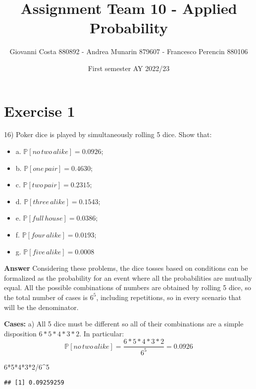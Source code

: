 \documentclass[
]{article}
\title{Assignment Team 10 - Applied Probability}
\author{Giovanni Costa 880892 - Andrea Munarin 879607 - Francesco
Perencin 880106}
\date{First semester AY 2022/23}
\newenvironment{Shaded}{\begin{snugshade}}{\end{snugshade}}
\newcommand{\DecValTok}[1]{\textcolor[rgb]{0.00,0.00,0.81}{#1}}
\newcommand{\SpecialCharTok}[1]{\textcolor[rgb]{0.00,0.00,0.00}{#1}}
\providecommand{\tightlist}{%
  \setlength{\itemsep}{0pt}\setlength{\parskip}{0pt}}
\begin{document}
\maketitle

{
\setcounter{tocdepth}{2}
\tableofcontents
}
\hypertarget{exercise-1}{%
\section{Exercise 1}\label{exercise-1}}

16) Poker dice is played by simultaneously rolling 5 dice. Show that:

\begin{itemize}
\tightlist
\item
  a. \(\mathbb P[no\, two\, alike] = 0.0926\);
\item
  b. \(\mathbb P[one\, pair] = 0.4630\);
\item
  c. \(\mathbb P[two\, pair] = 0.2315\);
\item
  d. \(\mathbb P[three\, alike] = 0.1543\);
\item
  e. \(\mathbb P[full\, house] = 0.0386\);
\item
  f. \(\mathbb P[four\, alike] = 0.0193\);
\item
  g. \(\mathbb P[five\, alike] = 0.0008\)
\end{itemize}

\textbf{Answer} Considering these problems, the dice tosses based on
conditions can be formalized as the probability for an event where all
the probabilities are mutually equal. All the possible combinations of
numbers are obtained by rolling 5 dice, so the total number of cases is
\(6^5\), including repetitions, so in every scenario that will be the
denominator.

\textbf{Cases:} a) All 5 dice must be different so all of their
combinations are a simple disposition \(6*5*4*3*2\). In particular:
\[\mathbb P[no\, two\, alike]=\frac{6*5*4*3*2}{6^5}=0.0926\]

\begin{Shaded}
\begin{Highlighting}[]
\DecValTok{6}\SpecialCharTok{*}\DecValTok{5}\SpecialCharTok{*}\DecValTok{4}\SpecialCharTok{*}\DecValTok{3}\SpecialCharTok{*}\DecValTok{2}\SpecialCharTok{/}\DecValTok{6}\SpecialCharTok{\^{}}\DecValTok{5}
\end{Highlighting}
\end{Shaded}

\begin{verbatim}
## [1] 0.09259259
\end{verbatim}
\end{document}
